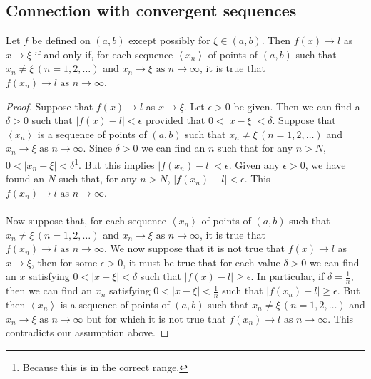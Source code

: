 \documentclass[10pt, a4paper]{article}
\newcommand{\limas}[3][n]{#2 \rightarrow #3 \text{ as } #1 \rightarrow \infty}
\newcommand{\seq}[1][x_n]{\left\langle #1 \right\rangle}
\begin{document}
\subsection{Connection with convergent sequences}
\begin{theorem}\label{thm_fun_lim_relseq}
    Let $f$ be defined on $(a, b)$ except possibly for $\xi \in (a, b)$. Then $f(x) \rightarrow l$ as $x \rightarrow \xi$ if and only if, for each sequence $\seq$ of points of $(a, b)$ such that $x_n \neq \xi\,(n = 1, 2, \dotsc)$ and $\limas{x_n}{\xi}$, it is true that $\limas{f(x_n)}{l}$.
    \begin{proof}
        Suppose that $f(x) \rightarrow l$ as $x \rightarrow \xi$. Let $\epsilon > 0$ be given. Then we can find a $\delta > 0 $ such that $|f(x) - l| < \epsilon$ provided that $0 < |x - \xi| < \delta$. Suppose that $\seq$ is a sequence of points of $(a, b)$ such that $x_n \neq \xi\,(n = 1, 2, \dotsc)$ and $\limas{x_n}{\xi}$. Since $\delta > 0$ we can find an $n$ such that for any $n > N$, $0 < |x_n - \xi| < \delta$\footnote{Because this is in the correct range.}. But this implies $|f(x_n) - l| < \epsilon$. Given any $\epsilon > 0$, we have found an $N$ such that, for any $n > N$, $|f(x_n) - l| < \epsilon$. This $\limas{f(x_n)}{l}$. \\
        \\
        Now suppose that, for each sequence $\seq$ of points of $(a, b)$ such that $x_n \neq \xi\,(n = 1, 2, \dotsc)$ and $\limas{x_n}{\xi}$, it is true that $\limas{f(x_n)}{l}$. We now suppose that it is not true that $f(x) \rightarrow l$ as $x \rightarrow \xi$, then for some $\epsilon > 0$, it must be true that for each value $\delta > 0$ we can find an $x$ satisfying $0 < |x - \xi| < \delta$ such that $|f(x) - l| \geq \epsilon$. In particular, if $\delta = \frac{1}{n}$, then we can find an $x_n$ satisfying $0 < |x - \xi| < \frac{1}{n}$ such that $|f(x_n) - l| \geq \epsilon$. But then $\seq$ is a sequence of points of $(a, b)$ such that $x_n \neq \xi\,(n = 1, 2, \dotsc)$ and $\limas{x_n}{\xi}$ but for which it is not true that $\limas{f(x_n)}{l}$. This contradicts our assumption above.
    \end{proof}
\end{theorem}
\end{document}
